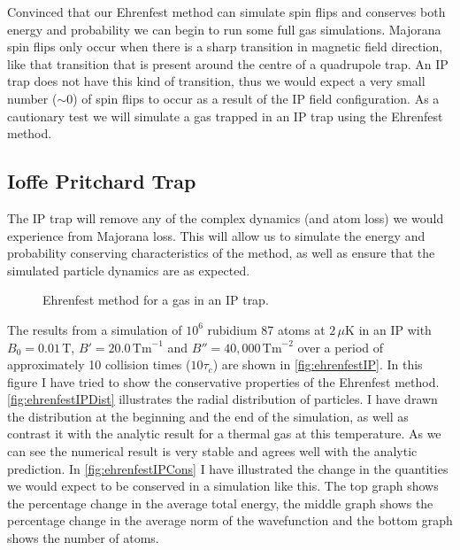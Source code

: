Convinced that our Ehrenfest method can simulate spin flips and conserves both energy and probability we can begin to run some full gas simulations.
Majorana spin flips only occur when there is a sharp transition in magnetic field direction, like that transition that is present around the centre of a quadrupole trap.
An IP trap does not have this kind of transition, thus we would expect a very small number ($\sim 0$) of spin flips to occur as a result of the IP field configuration.
As a cautionary test we will simulate a gas trapped in an IP trap using the Ehrenfest method.


\subsection{Ioffe Pritchard Trap}

The IP trap will remove any of the complex dynamics (and atom loss) we would experience from Majorana loss.
This will allow us to simulate the energy and probability conserving characteristics of the method, as well as ensure that the simulated particle dynamics are as expected.

\begin{figure}
\hspace{-11em}
\caption{Ehrenfest method for a gas in an IP trap.}\label{fig:ehrenfestIP}
\end{figure}

The results from a simulation of $10^6$ rubidium 87 atoms at $2\,\mu\mathrm{K}$ in an IP with $B_0=0.01\,\mathrm{T}$, $B'=20.0\,\mathrm{Tm}^{-1}$ and $B''=40,000\,\mathrm{Tm}^{-2}$ over a period of approximately 10 collision times ($10\tau_c$) are shown in \autoref{fig:ehrenfestIP}.
In this figure I have tried to show the conservative properties of the Ehrenfest method.
\autoref{fig:ehrenfestIPDist} illustrates the radial distribution of particles.
I have drawn the distribution at the beginning and the end of the simulation, as well as contrast it with the analytic result for a thermal gas at this temperature.
As we can see the numerical result is very stable and agrees well with the analytic prediction.
In \autoref{fig:ehrenfestIPCons} I have illustrated the change in the quantities we would expect to be conserved in a simulation like this.
The top graph shows the percentage change in the average total energy, the middle graph shows the percentage change in the average norm of the wavefunction and the bottom graph shows the number of atoms.


